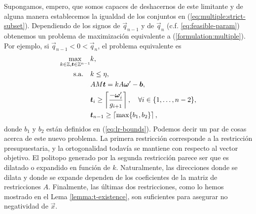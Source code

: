 Supongamos, empero, que somos capaces de deshacernos de este limitante y de alguna manera
establecemos la igualdad de los conjuntos en (\ref{eq:multiple:strict-subset}). Dependiendo de los
signos de $\vec{q}_{n-1}$ y de $\vec{q}_n$ (c.f. \ref{eq:feasible-param}) obtenemos un problema de
maximización equivalente a (\ref{formulation:multiple}). Por ejemplo, si $\vec{q}_{n-1} < 0 <
\vec{q}_n$, el problema equivalente es
\begin{subequations}
	\label{formulation:lattice}
	\begin{align}
		\max_{k \in \mathbb{Z}, \boldsymbol{t} \in \mathbb{Z}^{n-1}}
			& k, \\
		\text{s.a.} \quad
			& k \leq \eta, \label{lattice:c-layer} \\
			& AM\boldsymbol{t} = kA\boldsymbol{\omega}' - \boldsymbol{b}, \label{lattice:constraints} \\
			& \boldsymbol{t}_i \geq \left\lceil \frac{-\boldsymbol{\omega}_i'}{g_{i + 1}} \right\rceil, \quad
			\forall i \in \lbrace 1, \ldots, n - 2 \rbrace, \label{lattice:pos-1} \\
			& \boldsymbol{t}_{n - 1} \geq \left\lceil \max\lbrace b_1, b_2 \rbrace \right\rceil,
			\label{lattice:pos-2}
	\end{align}
\end{subequations}
donde $b_1$ y $b_2$ están definidos en (\ref{eq:lr-bounds}). Podemos decir un par de cosas acerca de
este nuevo problema. La primera restricción corresponde a la restricción presupuestaria, y la
ortogonalidad todavía se mantiene con respecto al vector objetivo. El politopo generado por la
segunda restricción parece ser que es dilatado o expandido en función de $k$. Naturalmente, las
direcciones donde se dilata y donde se expande dependen de los coeficientes de la matriz de
restricciones $A$. Finalmente, las últimas dos restricciones, como lo hemos mostrado en el Lema
\ref{lemma:t-existence}, son suficientes para asegurar no negatividad de $\vec{x}$.

